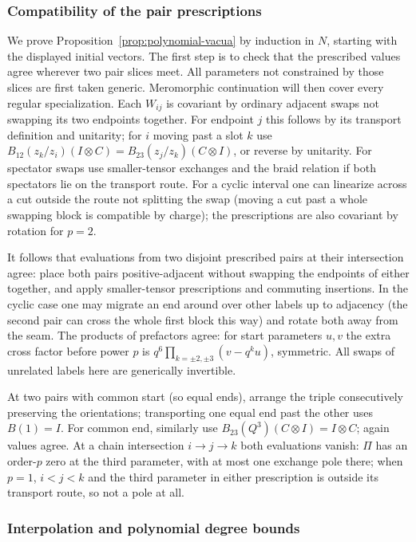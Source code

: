 \subsubsection{Compatibility of the pair prescriptions}

We prove Proposition~\ref{prop:polynomial-vacua} by induction in \(N\),
starting with the displayed initial vectors. The first step is to check
that the prescribed values agree wherever two pair slices meet.
All parameters not constrained by those slices are first taken
generic. Meromorphic continuation will then cover every regular
specialization. Each \(W_{ij}\) is covariant by ordinary adjacent swaps not swapping its two endpoints together. For endpoint \(j\) this follows by its transport definition and unitarity; for \(i\) moving past a slot \(k\) use
\(B_{12}(z_k/z_i)(I\otimes C)=B_{23}(z_j/z_k)(C\otimes I)\), or reverse by unitarity. For spectator swaps use smaller-tensor exchanges and the braid relation if both spectators lie on the transport route. For a cyclic interval one can linearize across a cut outside the route not splitting the swap (moving a cut past a whole swapping block is compatible by charge); the prescriptions are also covariant by rotation for \(p=2\).

It follows that evaluations from two disjoint prescribed pairs at their intersection agree: place both pairs positive-adjacent without swapping the endpoints of either together, and apply smaller-tensor prescriptions and commuting insertions. In the cyclic case one may migrate an end around over other labels up to adjacency (the second pair can cross the whole first block this way) and rotate both away from the seam. The products of prefactors agree: for start parameters \(u,v\) the extra cross factor before power \(p\) is \(q^6\prod_{k=\pm2,\pm3}(v-q^k u)\), symmetric. All swaps of unrelated labels here are generically invertible.

At two pairs with common start (so equal ends), arrange the triple consecutively preserving the orientations; transporting one equal end past the other uses \(B(1)=I\). For common end, similarly use \(B_{23}(Q^3)(C\otimes I)=I\otimes C\); again values agree. At a chain intersection \(i\to j\to k\) both evaluations vanish: \(\Pi\) has an order-\(p\) zero at the third parameter, with at most one exchange pole there; when \(p=1\), \(i<j<k\) and the third parameter in either prescription is outside its transport route, so not a pole at all.

\subsubsection{Interpolation and polynomial degree bounds}

